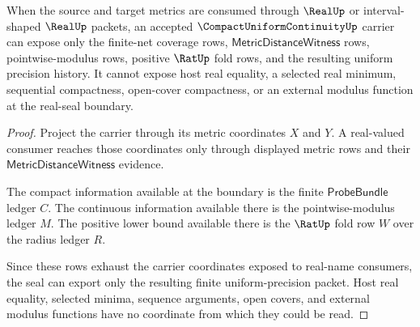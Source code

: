 \begin{theorem}
\label{thm:compact-uniform-continuity-real-seal-boundary}
When the source and target metrics are consumed through $\RealUp$ or interval-shaped $\RealUp$ packets, an accepted $\CompactUniformContinuityUp$ carrier can expose only the finite-net coverage rows, $\mathsf{MetricDistanceWitness}$ rows, pointwise-modulus rows, positive $\RatUp$ fold rows, and the resulting uniform precision history. It cannot expose host real equality, a selected real minimum, sequential compactness, open-cover compactness, or an external modulus function at the real-seal boundary.
\end{theorem}
\begin{proof}
Project the carrier through its metric coordinates $X$ and $Y$. A real-valued consumer reaches those coordinates only through displayed metric rows and their $\mathsf{MetricDistanceWitness}$ evidence.

The compact information available at the boundary is the finite $\mathsf{ProbeBundle}$ ledger $C$. The continuous information available there is the pointwise-modulus ledger $M$. The positive lower bound available there is the $\RatUp$ fold row $W$ over the radius ledger $R$.

Since these rows exhaust the carrier coordinates exposed to real-name consumers, the seal can export only the resulting finite uniform-precision packet. Host real equality, selected minima, sequence arguments, open covers, and external modulus functions have no coordinate from which they could be read.
\end{proof}

